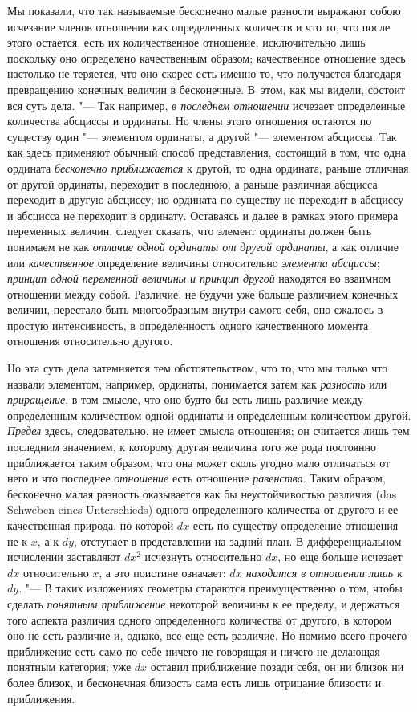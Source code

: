 Мы показали, что так называемые бесконечно малые разности выражают собою
исчезание членов отношения как определенных количеств и что то, что после
этого остается, есть их количественное отношение, исключительно лишь
поскольку оно определено качественным образом; качественное отношение здесь
настолько не теряется, что оно скорее есть именно то, что получается
благодаря превращению конечных величин в бесконечные. В~этом, как мы
видели, состоит вся суть дела. "--- Так например, {\em в
последнем отношении} исчезает определенные количества абсциссы и ординаты.
Но члены этого отношения остаются по существу один "--- элементом ординаты,
а другой "--- элементом абсциссы. Так как здесь применяют обычный способ
представления, состоящий в том, что одна ордината
{\em бесконечно приближается} к другой, то одна
ордината, раньше отличная от другой ординаты, переходит в последнюю, а
раньше различная абсцисса переходит в другую абсциссу; но ордината по
существу не переходит в абсциссу и абсцисса не переходит в ординату.
Оставаясь и далее в рамках этого примера переменных величин, следует
сказать, что элемент ординаты должен быть понимаем не как
{\em отличие одной ординаты от другой ординаты}, а как
отличие или {\em качественное} определение величины
относительно {\em элемента абсциссы};
{\em принцип одной переменной величины и принцип
другой} находятся во взаимном отношении между собой. Различие, не будучи
уже больше различием конечных величин, перестало быть многообразным внутри
самого себя, оно сжалось в простую интенсивность, в определенность одного
качественного момента отношения относительно другого.

Но эта суть дела затемняется тем обстоятельством, что то, что мы только что
назвали элементом, например, ординаты, понимается затем как
{\em разность} или
{\em приращение}, в том смысле, что оно будто бы есть
лишь различие между определенным количеством одной ординаты и определенным
количеством другой. {\em Предел} здесь, следовательно,
не имеет смысла отношения; он считается лишь тем последним значением, к
которому другая величина того же рода постоянно приближается таким образом,
что она может сколь угодно мало отличаться от него и что последнее
{\em отношение} есть отношение
{\em равенства}. Таким образом, бесконечно малая
разность оказывается как бы неустойчивостью различия (das Schweben eines
Unterschieds) одного определенного количества от другого и ее качественная
природа, по которой $dx$ есть по существу
определение отношения не к $x$, а к
$dy$, отступает в представлении на задний план. В
дифференциальном исчислении заставляют
$dx^2$ исчезнуть относительно
$dx$, но еще больше исчезает $dx$ относительно $x$, а
это поистине означает: {\em $dx$ находится в отношении
лишь к $dy$}. "--- В таких изложениях геометры стараются преимущественно
о том, чтобы сделать {\em понятным приближение} некоторой
величины к ее пределу, и держаться того аспекта различия одного
определенного количества от другого, в котором оно не есть различие и,
однако, все еще есть различие. Но помимо всего прочего приближение есть
само по себе ничего не говорящая и ничего не делающая понятным категория;
уже $dx$ оставил приближение позади себя, он ни
близок ни более близок, и бесконечная близость сама есть лишь отрицание
близости и приближения.

